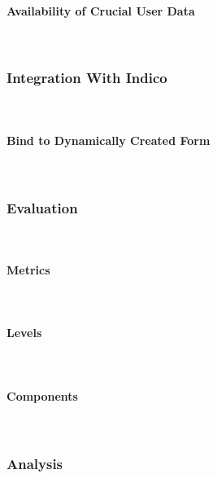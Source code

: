 \paragraph{Availability of Crucial User Data}\mbox{}\\

\subsubsection{Integration With Indico}\mbox{}\\

\paragraph{Bind to Dynamically Created Form}\mbox{}\\

\subsubsection{Evaluation}\mbox{}\\

\paragraph{Metrics}\mbox{}\\
\paragraph{Levels}\mbox{}\\
\paragraph{Components}\mbox{}\\

\subsubsection{Analysis}\mbox{}\\
